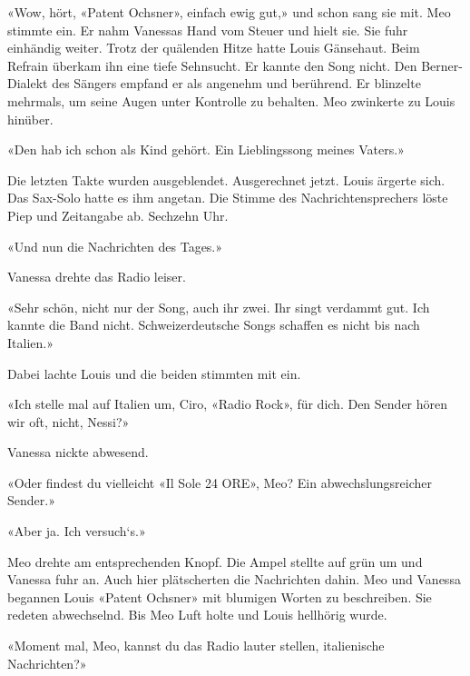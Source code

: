 «Wow, hört, «Patent Ochsner», einfach ewig gut,» und schon sang
sie mit. Meo stimmte ein. Er nahm Vanessas Hand vom Steuer und hielt
sie. Sie fuhr einhändig weiter.
Trotz der quälenden Hitze hatte Louis Gänsehaut.
Beim Refrain überkam ihn eine tiefe Sehnsucht. Er kannte den Song nicht.
Den Berner-Dialekt des Sängers empfand er als angenehm und berührend. Er
blinzelte mehrmals, um seine Augen unter Kontrolle zu behalten. Meo zwinkerte zu Louis hinüber.

«Den hab ich schon als Kind gehört. Ein Lieblingssong meines Vaters.»


Die letzten Takte wurden ausgeblendet. Ausgerechnet jetzt. Louis ärgerte
sich. Das Sax-Solo hatte es ihm angetan.
Die Stimme des Nachrichtensprechers löste Piep und Zeitangabe ab. Sechzehn Uhr.

«Und nun die Nachrichten des Tages.»

Vanessa drehte das Radio leiser.

«Sehr schön, nicht nur der Song, auch ihr zwei. Ihr singt verdammt gut.
Ich kannte die Band nicht. Schweizerdeutsche Songs schaffen es nicht bis
nach Italien.»

Dabei lachte Louis und die beiden stimmten mit ein.

«Ich stelle mal auf Italien um, Ciro, «Radio Rock», für dich. Den Sender
hören wir oft, nicht, Nessi?»

Vanessa nickte abwesend. 

«Oder findest du vielleicht «Il Sole 24 ORE», Meo? Ein abwechslungsreicher Sender.»

«Aber ja. Ich versuch`s.» 

Meo drehte am entsprechenden Knopf. 
Die Ampel stellte auf grün um und Vanessa fuhr an.
Auch hier plätscherten die Nachrichten dahin. Meo und Vanessa begannen
Louis «Patent Ochsner» mit blumigen Worten zu beschreiben. Sie redeten
abwechselnd. Bis Meo Luft holte und Louis hellhörig wurde.

«Moment mal, Meo, kannst du das Radio lauter stellen, italienische
Nachrichten?»

\sectionbreak



